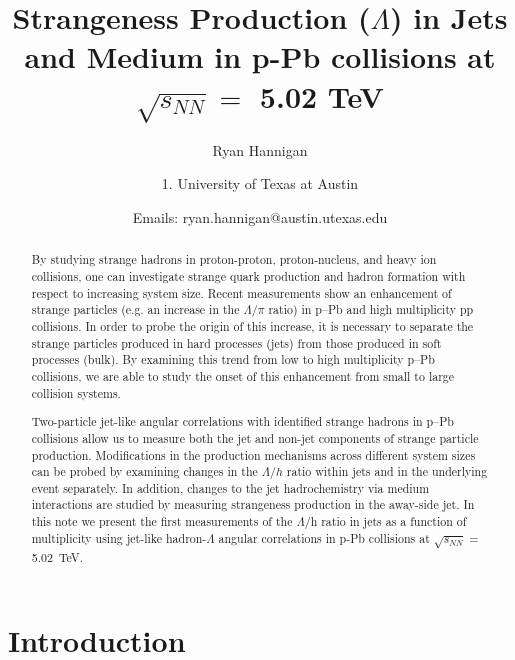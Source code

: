 \documentclass[ALICE,manyauthors]{ALICE_analysis_notes}
\begin{document}
%
%
%
\begin{titlepage}
%
\PHdate{\today}
%
\title{Strangeness Production ($\Lambda$) in Jets and Medium in p-Pb collisions at $\sqrt{s_{NN}} = $ 5.02 TeV}
%
\author{Ryan Hannigan}
\author{
1. University of Texas at Austin\\
}
\author{Emails: ryan.hannigan@austin.utexas.edu}
%
%
\begin{abstract}
By studying strange hadrons in proton-proton, proton-nucleus, and heavy ion collisions, one can investigate strange quark production and hadron formation with respect to increasing system size. Recent measurements show an enhancement of strange particles (e.g. an increase in the $\Lambda$/$\pi$ ratio) in p--Pb and high multiplicity pp collisions. In order to probe the origin of this increase, it is necessary to separate the strange particles produced in hard processes (jets) from those produced in soft processes (bulk). By examining this trend from low to high multiplicity p--Pb collisions, we are able to study the onset of this enhancement from small to large collision systems.

Two-particle jet-like angular correlations with identified strange hadrons in p--Pb collisions allow us to measure both the jet and non-jet components of strange particle production. Modifications in the production mechanisms across different system sizes can be probed by examining changes in the $\Lambda/h$ ratio within jets and in the underlying event separately. In addition, changes to the jet hadrochemistry via medium interactions are studied by measuring strangeness production in the away-side jet. In this note we present the first measurements of the $\Lambda$/h ratio in jets as a function of multiplicity using jet-like hadron-$\Lambda$ angular correlations in p-Pb collisions at $\sqrt{s_{NN}} =$ \SI{5.02}{TeV}.
\end{abstract}
\end{titlepage}
%
\tableofcontents
\clearpage

\section{Introduction}
\end{document}
